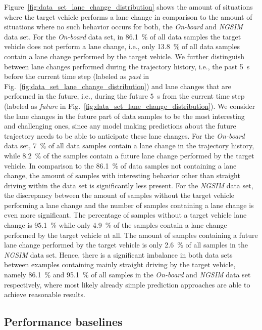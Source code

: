 Figure~\ref{fig:data_set_lane_change_distribution} shows the amount of situations where the target vehicle performs a lane change in comparison to the amount of situations where no such behavior occurs for both, the \emph{On-board} and \emph{\ac{NGSIM}} data set.
For the \emph{On-board} data set, in \SI{86.1}{\percent} of all data samples the target vehicle does not perform a lane change, i.e., only \SI{13.8}{\percent} of all data samples contain a lane change performed by the target vehicle.
We further distinguish between lane changes performed during the trajectory history, i.e., the past \SI{5}{\second} before the current time step (labeled as \emph{past} in Fig.~\ref{fig:data_set_lane_change_distribution}) and lane changes that are performed in the future, i.e., during the future \SI{5}{\second} from the current time step (labeled as \emph{future} in Fig.~\ref{fig:data_set_lane_change_distribution}).
We consider the lane changes in the future part of data samples to be the most interesting and challenging ones, since any model making predictions about the future trajectory needs to be able to anticipate these lane changes.
For the \emph{On-board} data set, \SI{7}{\percent} of all data samples contain a lane change in the trajectory history, while \SI{8.2}{\percent} of the samples contain a future lane change performed by the target vehicle.
In comparison to the \SI{86.1}{\percent} of data samples not containing a lane change, the amount of samples with interesting behavior other than straight driving within the data set is significantly less present.
For the \emph{\ac{NGSIM}} data set, the discrepancy between the amount of samples without the target vehicle performing a lane change and the number of samples containing a lane change is even more significant.
The percentage of samples without a target vehicle lane change is \SI{95.1}{\percent} while only \SI{4.9}{\percent} of the samples contain a lane change performed by the target vehicle at all.
The amount of samples containing a future lane change performed by the target vehicle is only \SI{2.6}{\percent} of all samples in the \emph{\ac{NGSIM}} data set.
Hence, there is a significant imbalance in both data sets between examples containing mainly straight driving by the target vehicle, namely \SI{86.1}{\percent} and \SI{95.1}{\percent} of all samples in the \emph{On-board} and \emph{\ac{NGSIM}} data set respectively, where most likely already simple prediction approaches are able to achieve reasonable results.

\subsection{Performance baselines}
\label{subsec:baselines}

